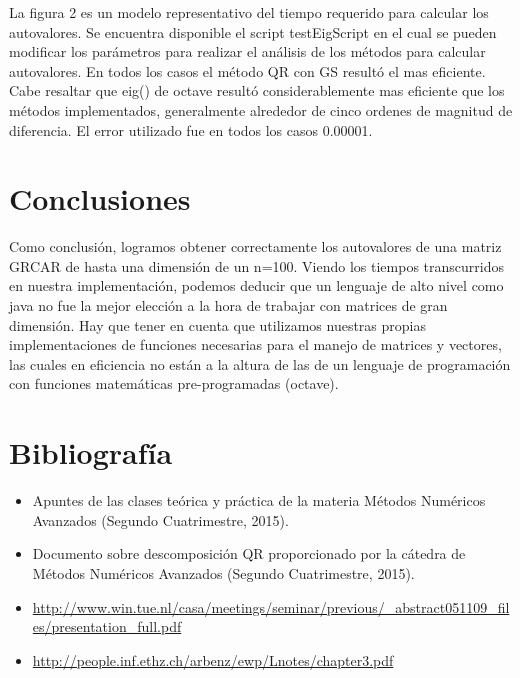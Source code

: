 \documentclass[a4paper,10pt,spanish]{article}
\begin{document}
La figura 2 es un modelo representativo del tiempo requerido para calcular los autovalores. Se encuentra disponible el script testEigScript en el cual se pueden modificar los parámetros para realizar el análisis de los métodos para calcular autovalores. En todos los casos el método QR con GS resultó el mas eficiente. Cabe resaltar que eig() de octave resultó considerablemente mas eficiente que los métodos implementados, generalmente alrededor de cinco ordenes de magnitud de diferencia. El error utilizado fue en todos los casos 0.00001.

\section{Conclusiones}
Como conclusión, logramos obtener correctamente los autovalores de una matriz GRCAR de hasta una dimensión de un n=100. Viendo los tiempos transcurridos en nuestra implementación, podemos deducir que un lenguaje de alto nivel como java no fue la mejor elección a la hora de trabajar con matrices de gran dimensión. Hay que tener en cuenta que utilizamos nuestras propias implementaciones de funciones necesarias para el manejo de matrices y vectores, las cuales en eficiencia no están a la altura de las de un lenguaje de programación con funciones matemáticas pre-programadas (octave).

\pagebreak

\section{Bibliografía}
\begin{itemize}

\item Apuntes de las clases teórica y práctica de la materia Métodos Numéricos Avanzados (Segundo Cuatrimestre, 2015).

\item Documento sobre descomposición QR proporcionado por la cátedra de Métodos Numéricos Avanzados (Segundo Cuatrimestre, 2015).

\item \url{http://www.win.tue.nl/casa/meetings/seminar/previous/_abstract051109_files/presentation_full.pdf}

\item \url{http://people.inf.ethz.ch/arbenz/ewp/Lnotes/chapter3.pdf}

\end{itemize}

\pagebreak
\end{document}
